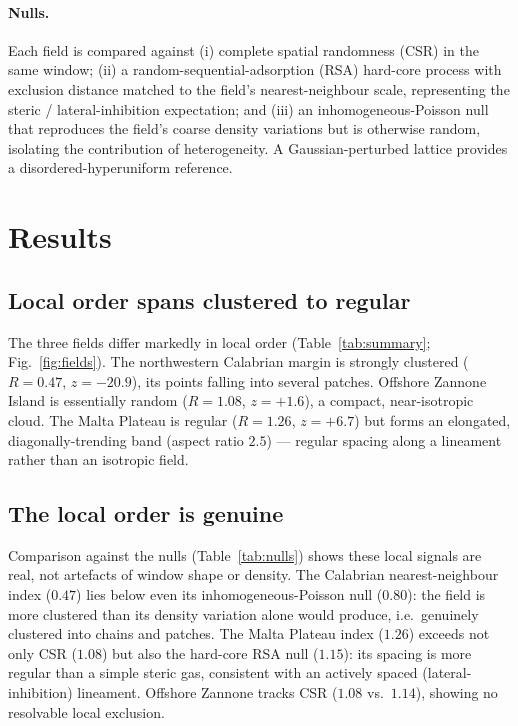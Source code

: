 \documentclass[11pt]{article}
\begin{document}
\paragraph{Nulls.} Each field is compared against (i) complete spatial
randomness (CSR) in the same window; (ii) a random-sequential-adsorption (RSA)
hard-core process with exclusion distance matched to the field's
nearest-neighbour scale, representing the steric / lateral-inhibition
expectation; and (iii) an inhomogeneous-Poisson null that reproduces the field's
coarse density variations but is otherwise random, isolating the contribution of
heterogeneity. A Gaussian-perturbed lattice provides a disordered-hyperuniform
reference.

\section{Results}

\subsection{Local order spans clustered to regular}

The three fields differ markedly in local order (Table~\ref{tab:summary};
Fig.~\ref{fig:fields}). The northwestern Calabrian margin is strongly clustered
($R=0.47$, $z=-20.9$), its points falling into several patches. Offshore Zannone
Island is essentially random ($R=1.08$, $z=+1.6$), a compact, near-isotropic
cloud. The Malta Plateau is regular ($R=1.26$, $z=+6.7$) but forms an elongated,
diagonally-trending band (aspect ratio $2.5$) --- regular spacing along a
lineament rather than an isotropic field.

\subsection{The local order is genuine}

Comparison against the nulls (Table~\ref{tab:nulls}) shows these local signals
are real, not artefacts of window shape or density. The Calabrian
nearest-neighbour index ($0.47$) lies below even its inhomogeneous-Poisson null
($0.80$): the field is more clustered than its density variation alone would
produce, i.e.\ genuinely clustered into chains and patches. The Malta Plateau
index ($1.26$) exceeds not only CSR ($1.08$) but also the hard-core RSA null
($1.15$): its spacing is more regular than a simple steric gas, consistent with
an actively spaced (lateral-inhibition) lineament. Offshore Zannone tracks CSR
($1.08$ vs.\ $1.14$), showing no resolvable local exclusion.
\end{document}
